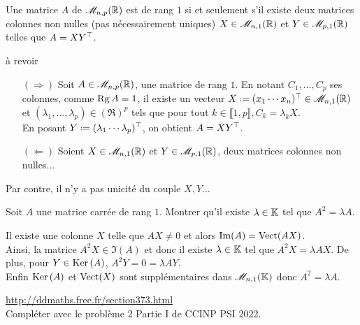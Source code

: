 \begin{prop}
    Une matrice $A$ de $\mathscr{M}_{n,p}(\mathbb{R})$ est de rang $1$ si et seulement s'il existe deux matrices colonnes non nulles (pas nécessairement uniques) $X \in \mathscr{M}_{n,1}(\mathbb{R})$ et $Y \in \mathscr{M}_{p,1}(\mathbb{R})$ telles que $A = X Y^\top$. 
\end{prop}

\begin{preuve}
    à revoir
    \begin{itemize}
        \item[$(\Rightarrow)$] Soit $A \in \mathscr{M}_{n,p}(\mathbb{R})$, une matrice de rang $1$. En notant $C_1, \dots, C_p$ ses colonnes, comme $\mathrm{Rg}\, A = 1$, il existe un vecteur $X \defeq \Trsp{(x_1 \cdots x_n)}\in \M_{n,1}(\R)$ et $(\lambda_1, \dots, \lambda_p) \in (\Re)^p$ tels que pour tout $k \in \llbracket 1, p \rrbracket, C_k = \lambda_k X$. \\
        En posant $Y \defeq \Trsp{(\lambda_1 \cdots \lambda_p)}$, on obtient $A = X Y^\top$.
        \item[$(\Leftarrow)$] Soient $X \in \mathscr{M}_{n,1}(\mathbb{R})$ et $Y \in \mathscr{M}_{p,1}(\mathbb{R})$, deux matrices colonnes non nulles...
    \end{itemize}
    Par contre, il n'y a pas unicité du couple $X, Y$...
\end{preuve}

\begin{exercice}
    Soit $A$ une matrice carrée de rang $1$. Montrer qu'il existe $\lambda \in \mathbb{K}$ tel que $A^2 = \lambda A$.
\end{exercice}

\begin{solution}
    Il existe une colonne $X$ telle que $AX \not= 0$ et alors $\Im(A) = \mathrm{Vect}(AX)$. \\
    Ainsi, la matrice $A^2X \in \Im(A)$ et donc il existe $\lambda \in \mathbb{K}$ tel que $A^2X = \lambda AX$. De plus, pour $Y \in \mathrm{Ker}\,(A)$, $A^2Y = 0 = \lambda AY$. \\
    Enfin $\mathrm{Ker}\,(A)$ et $\mathrm{Vect}(X)$ sont supplémentaires dans $\mathscr{M}_{n,1}(\mathbb{K})$ donc $A^2 = \lambda A$.
\end{solution}

\url{http://ddmaths.free.fr/section373.html} \\
Compléter avec le problème 2 Partie I de CCINP PSI 2022.

